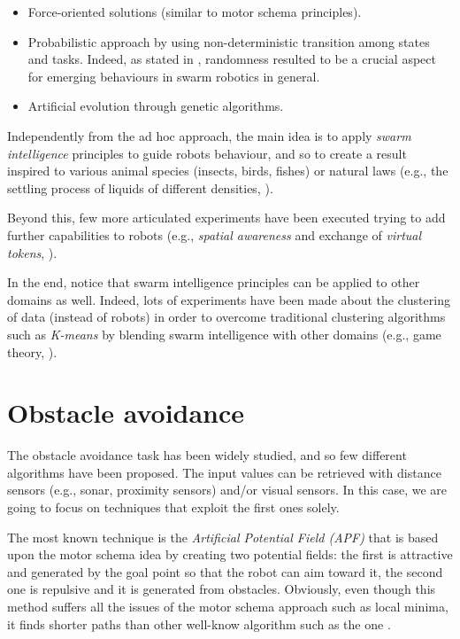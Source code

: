 \begin{itemize}

  \item Force-oriented solutions (similar to motor schema principles).
  \item Probabilistic approach by using non-deterministic transition among states and tasks. Indeed, as stated in \cite{clustering-randomness} \cite{clustering-data}, randomness resulted to be a crucial aspect for emerging behaviours in swarm robotics in general. 
  \item Artificial evolution through genetic algorithms. 

\end{itemize}

Independently from the ad hoc approach, the main idea is to apply \textit{swarm intelligence} principles to guide robots behaviour, and so to create a result inspired to various animal species (insects, birds, fishes) or natural laws (e.g., the settling process of liquids of different densities, \cite{clustering-natural}). 

\noindent
Beyond this, few more articulated experiments have been executed trying to add further capabilities to robots (e.g., \textit{spatial awareness} and exchange of \textit{virtual tokens}, \cite{clustering-awareness}).

\noindent
In the end, notice that swarm intelligence principles can be applied to other domains as well. Indeed, lots of experiments have been made about the clustering of data (instead of robots) in order to overcome traditional clustering algorithms such as \textit{K-means} by blending swarm intelligence with other domains (e.g., game theory, \cite{clustering-data}). 

\section{Obstacle avoidance}

The obstacle avoidance task has been widely studied, and so few different algorithms have been proposed. 
The input values can be retrieved with distance sensors (e.g., sonar, proximity sensors) and/or visual sensors. In this case, we are going to focus on techniques that exploit the first ones solely.

\smallskip
The most known technique is the \textit{Artificial Potential Field (APF)} that is based upon the motor schema idea by creating two potential fields: the first is attractive and generated by the goal point so that the robot can aim toward it, the second one is repulsive and it is generated from obstacles. Obviously, even though this method suffers all the issues of the motor schema approach such as local minima, it finds shorter paths than other well-know algorithm such as the  one \cite{obstacle-summary} \cite{obstacle-summary-2}.

